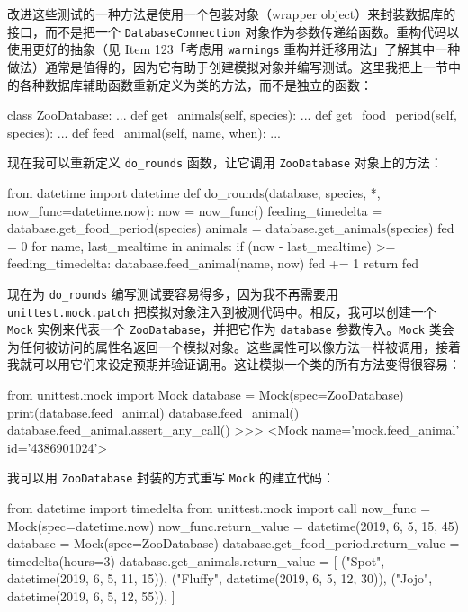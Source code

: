 改进这些测试的一种方法是使用一个包装对象（wrapper object）来封装数据库的接口，而不是把一个 \texttt{DatabaseConnection} 对象作为参数传递给函数。重构代码以使用更好的抽象（见 Item 123「考虑用 \texttt{warnings} 重构并迁移用法」了解其中一种做法）通常是值得的，因为它有助于创建模拟对象并编写测试。这里我把上一节中的各种数据库辅助函数重新定义为类的方法，而不是独立的函数：

\begin{codebox}[python]
class ZooDatabase:
    ...
    def get_animals(self, species):
        ...
    def get_food_period(self, species):
        ...
    def feed_animal(self, name, when):
        ...
\end{codebox}

现在我可以重新定义 \texttt{do\_rounds} 函数，让它调用 \texttt{ZooDatabase} 对象上的方法：

\begin{codebox}[python]
from datetime import datetime
def do_rounds(database, species, *, now_func=datetime.now):
    now = now_func()
    feeding_timedelta = database.get_food_period(species)
    animals = database.get_animals(species)
    fed = 0
    for name, last_mealtime in animals:
        if (now - last_mealtime) >= feeding_timedelta:
            database.feed_animal(name, now)
            fed += 1
    return fed
\end{codebox}

现在为 \texttt{do\_rounds} 编写测试要容易得多，因为我不再需要用 \texttt{unittest.mock.patch} 把模拟对象注入到被测代码中。相反，我可以创建一个 \texttt{Mock} 实例来代表一个 \texttt{ZooDatabase}，并把它作为 \texttt{database} 参数传入。\texttt{Mock} 类会为任何被访问的属性名返回一个模拟对象。这些属性可以像方法一样被调用，接着我就可以用它们来设定预期并验证调用。这让模拟一个类的所有方法变得很容易：

\begin{codebox}[python]
from unittest.mock import Mock
database = Mock(spec=ZooDatabase)
print(database.feed_animal)
database.feed_animal()
database.feed_animal.assert_any_call()
>>>
<Mock name='mock.feed_animal' id='4386901024'>
\end{codebox}

我可以用 \texttt{ZooDatabase} 封装的方式重写 \texttt{Mock} 的建立代码：

\begin{codebox}[python]
from datetime import timedelta
from unittest.mock import call
now_func = Mock(spec=datetime.now)
now_func.return_value = datetime(2019, 6, 5, 15, 45)
database = Mock(spec=ZooDatabase)
database.get_food_period.return_value = timedelta(hours=3)
database.get_animals.return_value = [
    ("Spot", datetime(2019, 6, 5, 11, 15)),
    ("Fluffy", datetime(2019, 6, 5, 12, 30)),
    ("Jojo", datetime(2019, 6, 5, 12, 55)),
]
\end{codebox}

